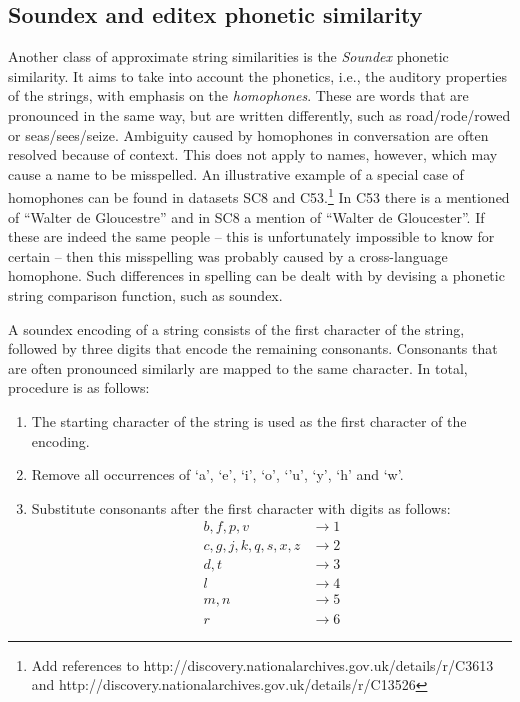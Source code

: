 

\subsection{Soundex and editex phonetic similarity}
\label{subsec:soundex}

Another class of approximate string similarities is the \emph{Soundex} phonetic similarity.
It aims to take into account the phonetics, i.e., the auditory properties of the strings, with emphasis on the \emph{homophones}.
These are words that are pronounced in the same way, but are written differently, such as road/rode/rowed or seas/sees/seize.
Ambiguity caused by homophones in conversation are often resolved because of context.
This does not apply to names, however, which may cause a name to be misspelled.
An illustrative example of a special case of homophones can be found in datasets SC8 and C53.\footnote{Add references to http://discovery.nationalarchives.gov.uk/details/r/C3613 and http://discovery.nationalarchives.gov.uk/details/r/C13526}
In C53 there is a mentioned of ``Walter de Gloucestre'' and in SC8 a mention of ``Walter de Gloucester''.
If these are indeed the same people -- this is unfortunately impossible to know for certain -- then this misspelling was probably caused by a cross-language homophone.
Such differences in spelling can be dealt with by devising a phonetic string comparison function, such as soundex.

A soundex encoding of a string consists of the first character of the string, followed by three digits that encode the remaining consonants.
Consonants that are often pronounced similarly are mapped to the same character.
In total, procedure is as follows:

\begin{enumerate}
    \item The starting character of the string is used as the first character of the encoding.
    \item Remove all occurrences of `a', `e', `i', `o', `'u', `y', `h' and `w'.
    \item Substitute consonants after the first character with digits as follows:\\
            \begin{align*}
                b, f, p, v &\rightarrow 1 \\
                c, g, j, k, q, s, x, z &\rightarrow 2 \\
                d, t &\rightarrow 3 \\
                l &\rightarrow 4 \\
                m, n &\rightarrow 5 \\
                r &\rightarrow 6
            \end{align*}
\end{enumerate}

